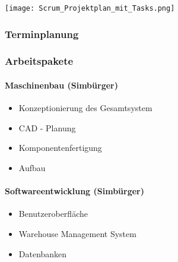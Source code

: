 \bgroup
    \centering
    \texttt{[image: Scrum\_Projektplan\_mit\_Tasks.png]}
\egroup

\newpage
\subsubsection{Terminplanung}

\newpage

\subsubsection{Arbeitspakete}

\paragraph{Maschinenbau (Simbürger)}
\begin{itemize}
    \item Konzeptionierung des Gesamtsystem
    \item CAD - Planung
    \item Komponentenfertigung
    \item Aufbau 
\end{itemize}

\paragraph{Softwareentwicklung (Simbürger)}
\begin{itemize}
    \item Benutzeroberfläche
    \item Warehouse Management System
    \item Datenbanken
\end{itemize}




\newpage

